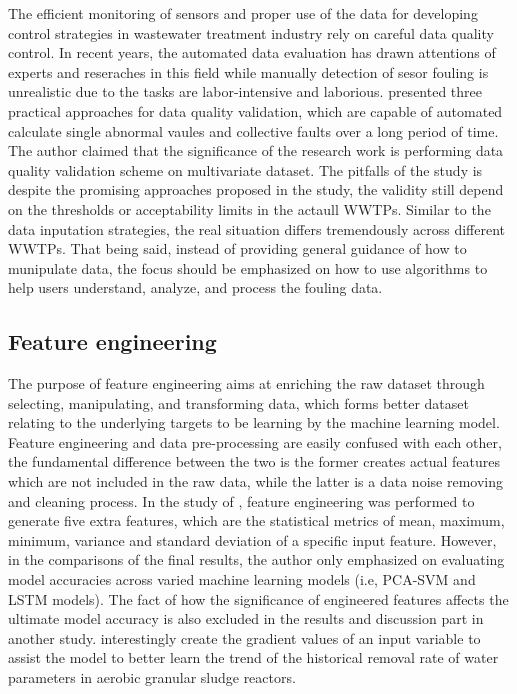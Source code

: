 The efficient monitoring of sensors and proper use of the data for developing control strategies in wastewater treatment industry rely on careful data quality control. In recent years, the automated data evaluation has drawn attentions of experts and reseraches in this field while manually detection of sesor fouling is unrealistic due to the tasks are labor-intensive and laborious. \citet{alferesValidatingDataQuality2013} presented three practical approaches for data quality validation, which are capable of automated calculate single abnormal vaules and collective faults over a long period of time. The author claimed that the significance of the research work is performing data quality validation scheme on multivariate dataset. The pitfalls of the study is despite the promising approaches proposed in the study, the validity still depend on the thresholds or acceptability limits in the actaull WWTPs. Similar to the data inputation strategies, the real situation differs tremendously across different WWTPs. That being said, instead of providing general guidance of how to munipulate data, the focus should be emphasized on how to use algorithms to help users understand, analyze, and process the fouling data.

\subsection{Feature engineering}
The purpose of feature engineering aims at enriching the raw dataset through selecting, manipulating, and transforming data, which forms better dataset relating to the underlying targets to be learning by the machine learning model. Feature engineering and data pre-processing are easily confused with each other, the fundamental difference between the two is the former creates actual features which are not included in the raw data, while the latter is a data noise removing and cleaning process. In the study of \citet{mamandipoorMonitoringDetectingFaults2020}, feature engineering was performed to generate five extra features, which are the statistical metrics of mean, maximum, minimum, variance and standard deviation of a specific input feature. However, in the comparisons of the final results, the author only emphasized on evaluating model accuracies across varied machine learning models (i.e, PCA-SVM and LSTM models). The fact of how the significance of engineered features affects the ultimate model accuracy is also excluded in the results and discussion part in another study. \citet{zaghloulDevelopmentEnsembleMachine2021} interestingly create the gradient values of an input variable to assist the model to better learn the trend of the historical removal rate of water parameters in aerobic granular sludge reactors.



